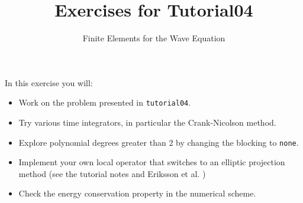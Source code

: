 \documentclass[12pt,a4paper]{article}
\title{\textbf{Exercises for Tutorial04}}
\subtitle{Finite Elements for the Wave  Equation}
\begin{document}
\exerciseheader

In this exercise you will:
\begin{itemize}
\item Work on the problem presented in \lstinline{tutorial04}.
\item Try various time integrators, in particular the Crank-Nicolson
  method.
\item Explore polynomial degrees greater than $2$ by changing the
  blocking to \lstinline{none}.
\item Implement your own local operator that switches to an elliptic
  projection method (see the tutorial notes and Eriksson et
  al. \cite{Eriksson})
\item Check the energy conservation property in the numerical scheme.
\end{itemize}
\end{document}

